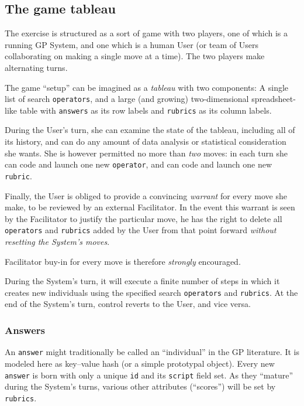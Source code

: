 \subsection{The game tableau}\hypertarget{the-game-tableau}{}\label{the-game-tableau}

The exercise is structured as a sort of game with two players, one of which is a running GP System, and one which is a human User (or team of Users collaborating on making a single move at a time). The two players make alternating turns.

The game ``setup'' can be imagined as a \emph{tableau} with two components: A single list of search {\tt operators}, and a large (and growing) two-dimensional spreadsheet-like table with {\tt answers} as its row labels and {\tt rubrics} as its column labels.

During the User's turn, she can examine the state of the tableau, including all of its history, and can do any amount of data analysis or statistical consideration she wants. She is however permitted no more than \emph{two} moves: in each turn she can code and launch one new {\tt operator}, and can code and launch one new {\tt rubric}.

Finally, the User is obliged to provide a convincing \emph{warrant} for every move she make, to be reviewed by an external Facilitator. In the event this warrant is seen by the Facilitator to justify the particular move, he has the right to delete all {\tt operators} and {\tt rubrics} added by the User from that point forward \emph{without resetting the System's moves}.

Facilitator buy-in for every move is therefore \emph{strongly} encouraged.

During the System's turn, it will execute a finite number of steps in which it creates new individuals using the specified search {\tt operators} and {\tt rubrics}. At the end of the System's turn, control reverts to the User, and vice versa.

\subsubsection{Answers}\hypertarget{answers}{}\label{answers}

An {\tt answer} might traditionally be called an ``individual'' in the GP literature. It is modeled here as key--value hash (or a simple prototypal object). Every new {\tt answer} is born with only a unique {\tt id} and its {\tt script} field set. As they ``mature'' during the System's turns, various other attributes (``scores'') will be set by {\tt rubrics}.


